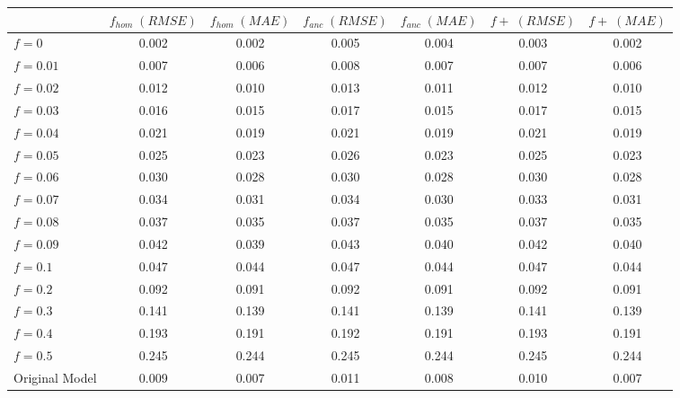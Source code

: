 \begin{tabular}{lcccccc}
\toprule
 & $f_{hom}\;(RMSE)$ & $f_{hom}\;(MAE)$ & $f_{anc}\;(RMSE)$ & $f_{anc}\;(MAE)$ & $f+\;(RMSE)$ & $f+\;(MAE)$ \\
\midrule
$f = 0$ & 0.002 & 0.002 & 0.005 & 0.004 & 0.003 & 0.002 \\
$f = 0.01$ & 0.007 & 0.006 & 0.008 & 0.007 & 0.007 & 0.006 \\
$f = 0.02$ & 0.012 & 0.010 & 0.013 & 0.011 & 0.012 & 0.010 \\
$f = 0.03$ & 0.016 & 0.015 & 0.017 & 0.015 & 0.017 & 0.015 \\
$f = 0.04$ & 0.021 & 0.019 & 0.021 & 0.019 & 0.021 & 0.019 \\
$f = 0.05$ & 0.025 & 0.023 & 0.026 & 0.023 & 0.025 & 0.023 \\
$f = 0.06$ & 0.030 & 0.028 & 0.030 & 0.028 & 0.030 & 0.028 \\
$f = 0.07$ & 0.034 & 0.031 & 0.034 & 0.030 & 0.033 & 0.031 \\
$f = 0.08$ & 0.037 & 0.035 & 0.037 & 0.035 & 0.037 & 0.035 \\
$f = 0.09$ & 0.042 & 0.039 & 0.043 & 0.040 & 0.042 & 0.040 \\
$f = 0.1$ & 0.047 & 0.044 & 0.047 & 0.044 & 0.047 & 0.044 \\
$f = 0.2$ & 0.092 & 0.091 & 0.092 & 0.091 & 0.092 & 0.091 \\
$f = 0.3$ & 0.141 & 0.139 & 0.141 & 0.139 & 0.141 & 0.139 \\
$f = 0.4$ & 0.193 & 0.191 & 0.192 & 0.191 & 0.193 & 0.191 \\
$f = 0.5$ & 0.245 & 0.244 & 0.245 & 0.244 & 0.245 & 0.244 \\
Original Model & 0.009 & 0.007 & 0.011 & 0.008 & 0.010 & 0.007 \\
\bottomrule
\end{tabular}
